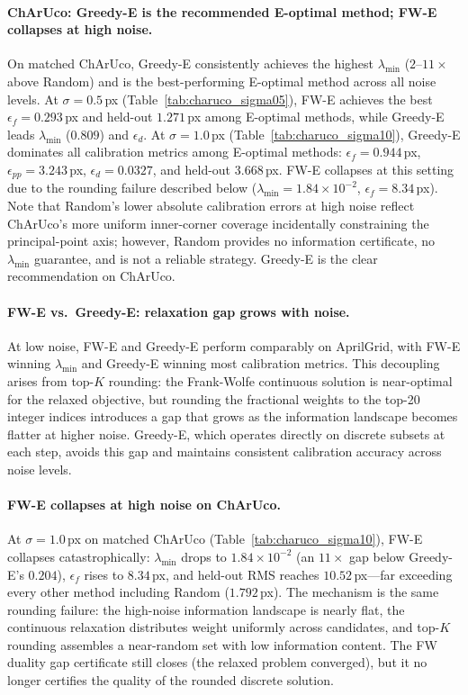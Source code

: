 \documentclass[11pt]{article}
\begin{document}
\paragraph{ChArUco: Greedy-E is the recommended E-optimal method; FW-E collapses at high noise.}
On matched ChArUco, Greedy-E consistently achieves the highest $\lambda_{\min}$
($2$--$11{\times}$ above Random) and is the best-performing E-optimal method
across all noise levels.
At $\sigma{=}0.5$\,px (Table~\ref{tab:charuco_sigma05}), FW-E achieves the
best $\epsilon_f{=}0.293$\,px and held-out $1.271$\,px among E-optimal methods,
while Greedy-E leads $\lambda_{\min}$ ($0.809$) and $\epsilon_d$.
At $\sigma{=}1.0$\,px (Table~\ref{tab:charuco_sigma10}), Greedy-E dominates
all calibration metrics among E-optimal methods:
$\epsilon_f{=}0.944$\,px, $\epsilon_{pp}{=}3.243$\,px, $\epsilon_d{=}0.0327$,
and held-out $3.668$\,px.
FW-E collapses at this setting due to the rounding failure described below
($\lambda_{\min}{=}1.84{\times}10^{-2}$, $\epsilon_f{=}8.34$\,px).
Note that Random's lower absolute calibration errors at high noise reflect
ChArUco's more uniform inner-corner coverage incidentally constraining the
principal-point axis; however, Random provides no information certificate,
no $\lambda_{\min}$ guarantee, and is not a reliable strategy.
Greedy-E is the clear recommendation on ChArUco.

\paragraph{FW-E vs.\ Greedy-E: relaxation gap grows with noise.}
At low noise, FW-E and Greedy-E perform comparably on AprilGrid, with FW-E
winning $\lambda_{\min}$ and Greedy-E winning most calibration metrics.
This decoupling arises from top-$K$ rounding: the Frank-Wolfe continuous
solution is near-optimal for the relaxed objective, but rounding the
fractional weights to the top-20 integer indices introduces a gap that grows
as the information landscape becomes flatter at higher noise.
Greedy-E, which operates directly on discrete subsets at each step, avoids
this gap and maintains consistent calibration accuracy across noise levels.

\paragraph{FW-E collapses at high noise on ChArUco.}
At $\sigma{=}1.0$\,px on matched ChArUco (Table~\ref{tab:charuco_sigma10}),
FW-E collapses catastrophically: $\lambda_{\min}$ drops to
$1.84\!\times\!10^{-2}$ (an $11{\times}$ gap below Greedy-E's $0.204$),
$\epsilon_f$ rises to $8.34$\,px, and held-out RMS reaches $10.52$\,px---far
exceeding every other method including Random ($1.792$\,px).
The mechanism is the same rounding failure: the high-noise information
landscape is nearly flat, the continuous relaxation distributes weight
uniformly across candidates, and top-$K$ rounding assembles a near-random
set with low information content.
The FW duality gap certificate still closes (the relaxed problem converged),
but it no longer certifies the quality of the rounded discrete solution.
\end{document}
